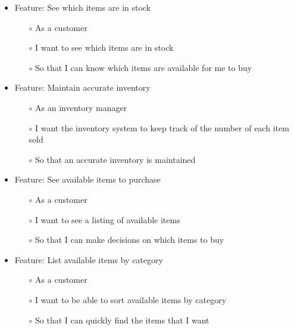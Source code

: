 \documentclass{scrreprt}
\theoremstyle{funreq}
\begin{document}
	
	
	\begin{itemize}
		\item Feature: See which items are in stock
		\begin{itemize}
			\item[$\circ$]As a customer
			\item[$\circ$]I want to see which items are in stock
			\item[$\circ$]So that I can know which items are available for me to buy
		\end{itemize}
	\end{itemize}
	
	\begin{itemize}
		\item Feature: Maintain accurate inventory
		\begin{itemize}
			\item[$\circ$]As an inventory manager
			\item[$\circ$]I want the inventory system to keep track of the number of each item sold
			\item[$\circ$]So that an accurate inventory is maintained
		\end{itemize}
	\end{itemize}
	
	\begin{itemize}
		\item Feature: See available items to purchase
		\begin{itemize}
			\item[$\circ$]As a customer
			\item[$\circ$]I want to see a listing of available items
			\item[$\circ$]So that I can make decisions on which items to buy
		\end{itemize}
	\end{itemize}
	
	\begin{itemize}
		\item Feature: List available items by category
		\begin{itemize}
			\item[$\circ$]As a customer
			\item[$\circ$]I want to be able to sort available items by category
			\item[$\circ$]So that I can quickly find the items that I want
		\end{itemize}
	\end{itemize}
	
\end{document}

